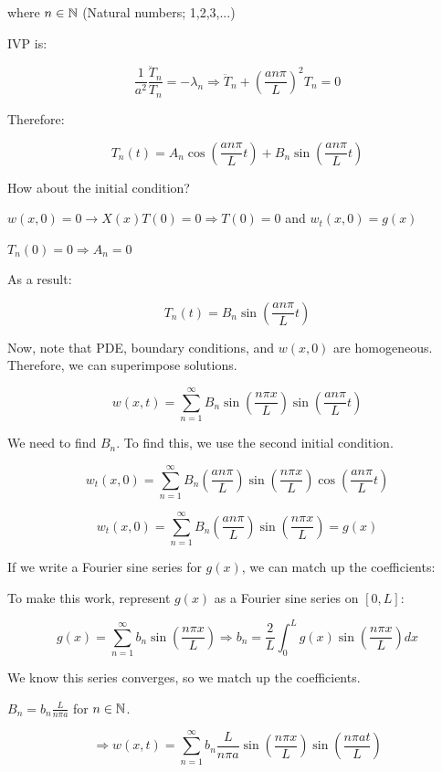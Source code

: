 \documentclass{article}
\begin{document}
where $n \in \mathbb{N}$ (Natural numbers; 1,2,3,...)

IVP is:

$$\frac{1}{a^2} \frac{\ddot{T}_n}{T_n} = -\lambda_n \Rightarrow \ddot{T}_n + \left( \frac{a n \pi}{L} \right)^2 T_n = 0$$

Therefore:

$$T_n(t) = A_n \cos \left(\frac{a n \pi}{L} t \right) + B_n \sin \left(\frac{a n \pi}{L} t \right)$$

How about the initial condition?

$w(x,0) = 0 \longrightarrow X(x) T(0) = 0 \Rightarrow T(0) = 0$ and $w_t (x,0) = g(x)$

$T_n (0) = 0 \Rightarrow A_n = 0$

\hfill

As a result:

$$T_n(t) = B_n \sin \left(\frac{a n \pi}{L} t \right)$$

Now, note that PDE, boundary conditions, and $w(x,0)$ are homogeneous. Therefore, we can superimpose solutions. 

$$w(x,t) = \sum_{n = 1}^\infty B_n \sin \left(\frac{n \pi x}{L} \right) \sin \left(\frac{a n \pi}{L} t \right)$$

We need to find $B_n$. To find this, we use the second initial condition. 

$$w_t (x,0) = \sum_{n = 1}^\infty B_n \left(\frac{a n \pi}{L} \right)  \sin \left(\frac{n \pi x}{L} \right) \cos \left(\frac{a n \pi}{L} t \right)$$

$$w_t (x,0) = \sum_{n = 1}^\infty B_n \left(\frac{a n \pi}{L} \right) \sin \left( \frac{n \pi x}{L} \right) = g(x)$$

If we write a Fourier sine series for $g(x)$, we can match up the coefficients:

To make this work, represent $g(x)$ as a Fourier sine series on $\left[ 0, L \right]$:

$$g(x) = \sum_{n = 1}^\infty b_n \sin \left(\frac{ n \pi x}{L} \right) \Rightarrow b_n = \frac{2}{L} \int_0^L g(x) \sin \left( \frac{ n \pi x}{L} \right) dx$$

We know this series converges, so we match up the coefficients. 
\begin{center}
    $B_n = b_n \frac{L}{n \pi a}$ for $n \in \mathbb{N}$. 
\end{center}


$$\Rightarrow w(x,t) = \sum_{n = 1}^\infty b_n \frac{L}{n \pi a} \sin \left( \frac{n \pi x}{L} \right) \sin \left( \frac{n \pi a t}{L} \right) $$
\end{document}
